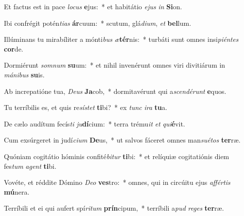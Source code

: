 \item Et factus est in pace \textit{lo}\textit{cus} \textbf{e}jus:~* et habitátio \textit{e}\textit{jus} \textit{in} \textbf{Si}on.
\item Ibi confrégit potén\textit{ti}\textit{as} \textbf{ár}cuum:~* scutum, glá\textit{di}\textit{um}, \textit{et} \textbf{bel}lum.
\item Illúminans tu mirabíliter a mónti\textit{bus} \textit{æ}\textbf{tér}nis:~* turbáti sunt omnes insi\textit{pi}\textit{én}\textit{tes} \textbf{cor}de.
\item Dormiérunt \textit{som}\textit{num} \textbf{su}um:~* et nihil invenérunt omnes viri divitiárum in \textit{má}\textit{ni}\textit{bus} \textbf{su}is.
\item Ab increpatióne tua, \textit{De}\textit{us} \textbf{Ja}cob,~* dormitavérunt qui a\textit{scen}\textit{dé}\textit{runt} \textbf{e}quos.
\item Tu terríbilis es, et quis re\textit{sís}\textit{tet} \textbf{ti}bi?~* ex \textit{tunc} \textit{i}\textit{ra} \textbf{tu}a.
\item De cælo audítum fecís\textit{ti} \textit{ju}\textbf{dí}cium:~* terra trému\textit{it} \textit{et} \textit{qui}\textbf{é}vit.
\item Cum exsúrgeret in judí\textit{ci}\textit{um} \textbf{De}us,~* ut salvos fáceret omnes man\textit{su}\textit{é}\textit{tos} \textbf{ter}ræ.
\item Quóniam cogitátio hóminis confité\textit{bi}\textit{tur} \textbf{ti}bi:~* et relíquiæ cogitatiónis diem fes\textit{tum} \textit{a}\textit{gent} \textbf{ti}bi.
\item Vovéte, et réddite Dómino \textit{De}\textit{o} \textbf{ves}tro:~* omnes, qui in circúitu ejus \textit{af}\textit{fér}\textit{tis} \textbf{mú}nera.
\item Terríbili et ei qui aufert spí\textit{ri}\textit{tum} \textbf{prín}cipum,~* terríbili a\textit{pud} \textit{re}\textit{ges} \textbf{ter}ræ.
